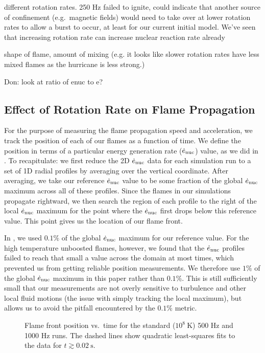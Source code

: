 \documentclass[preprint,times,tighten]{aastex63}
\newcommand{\enucdot}{\dot{e}_{\rm nuc}}
\begin{document}
different rotation rates. 250 Hz failed to ignite, could indicate that another source of confinement (e.g.\ magnetic fields) would need to take
over at lower rotation rates to allow a burst to occur, at least for our current initial model. We've seen that increasing rotation rate can
increase nuclear reaction rate already

shape of flame, amount of mixing (e.g. it looks like slower rotation rates have less mixed flames as the hurricane is less strong.)

Don: look at ratio of enuc to e?

\subsection{Effect of Rotation Rate on Flame Propagation}\label{ssec:rot_propagation}

For the purpose of measuring the flame propagation speed and acceleration, we track the position of each of our flames
as a function of time. We define the position in terms of a particular energy generation rate ($\enucdot$) value, as we did in \citet{flame_wave1}.
To recapitulate: we first reduce the 2D $\enucdot$ data for each simulation run to a set of 1D radial profiles by averaging
over the vertical coordinate. After averaging, we take our reference $\enucdot$ value to be some fraction of the global $\enucdot$
maximum across all of these profiles. Since the flames in our simulations propagate rightward, we then search the region of
each profile to the right of the local $\enucdot$ maximum for the point where the $\enucdot$ first drops below this reference
value. This point gives us the location of our flame front.

In \citet{flame_wave1}, we used $0.1\%$ of the global $\enucdot$ maximum for our reference value. For the high temperature
unboosted flames, however, we found that the $\enucdot$ profiles failed to reach that small a value across the domain at most times,
which prevented us from getting reliable position measurements. We therefore use $1\%$ of the global $\enucdot$ maximum in this paper
rather than $0.1\%$. This is still sufficiently small that our measurements are not overly sensitive to turbulence and other local fluid
motions (the issue with simply tracking the local maximum), but allows us to avoid the pitfall encountered by the $0.1\%$ metric.

\begin{figure}[t]
	\centering
	\caption{\label{fig:flame_speeds_1} Flame front position vs.\ time for the standard ($10^8~\mathrm{K}$) 500 Hz and 1000 Hz runs. The dashed lines
		show quadratic least-squares fits to the data for $t \gtrsim 0.02~\mathrm{s}$.}
\end{figure}
\end{document}
